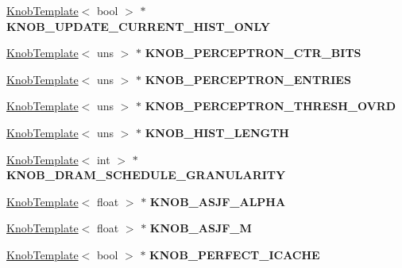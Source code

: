 \begin{DoxyCompactItemize}
\item 
\hypertarget{classall__knobs__c_a892cfb85ecfe285b22d06f8d9debe8f5}{
\hyperlink{classKnobTemplate}{KnobTemplate}$<$ bool $>$ $\ast$ {\bfseries KNOB\_\-UPDATE\_\-CURRENT\_\-HIST\_\-ONLY}}
\label{classall__knobs__c_a892cfb85ecfe285b22d06f8d9debe8f5}

\item 
\hypertarget{classall__knobs__c_a4e0c9cabfd5cf0704cd177f45fb22bc3}{
\hyperlink{classKnobTemplate}{KnobTemplate}$<$ uns $>$ $\ast$ {\bfseries KNOB\_\-PERCEPTRON\_\-CTR\_\-BITS}}
\label{classall__knobs__c_a4e0c9cabfd5cf0704cd177f45fb22bc3}

\item 
\hypertarget{classall__knobs__c_a1fc972188a6ca49600f55b396cf7f341}{
\hyperlink{classKnobTemplate}{KnobTemplate}$<$ uns $>$ $\ast$ {\bfseries KNOB\_\-PERCEPTRON\_\-ENTRIES}}
\label{classall__knobs__c_a1fc972188a6ca49600f55b396cf7f341}

\item 
\hypertarget{classall__knobs__c_a59005114c63ecf40c677c38a2db0c2e3}{
\hyperlink{classKnobTemplate}{KnobTemplate}$<$ uns $>$ $\ast$ {\bfseries KNOB\_\-PERCEPTRON\_\-THRESH\_\-OVRD}}
\label{classall__knobs__c_a59005114c63ecf40c677c38a2db0c2e3}

\item 
\hypertarget{classall__knobs__c_a28de6c797c5a2aadf18ddbf063769e09}{
\hyperlink{classKnobTemplate}{KnobTemplate}$<$ uns $>$ $\ast$ {\bfseries KNOB\_\-HIST\_\-LENGTH}}
\label{classall__knobs__c_a28de6c797c5a2aadf18ddbf063769e09}

\item 
\hypertarget{classall__knobs__c_a02025916c120090dedbfd08c6e9b68fe}{
\hyperlink{classKnobTemplate}{KnobTemplate}$<$ int $>$ $\ast$ {\bfseries KNOB\_\-DRAM\_\-SCHEDULE\_\-GRANULARITY}}
\label{classall__knobs__c_a02025916c120090dedbfd08c6e9b68fe}

\item 
\hypertarget{classall__knobs__c_a4b5116c2d753e3dcb70e5e061a9ea2e8}{
\hyperlink{classKnobTemplate}{KnobTemplate}$<$ float $>$ $\ast$ {\bfseries KNOB\_\-ASJF\_\-ALPHA}}
\label{classall__knobs__c_a4b5116c2d753e3dcb70e5e061a9ea2e8}

\item 
\hypertarget{classall__knobs__c_ad0d2c1b6646cb0c6f7fcd9dda391668b}{
\hyperlink{classKnobTemplate}{KnobTemplate}$<$ float $>$ $\ast$ {\bfseries KNOB\_\-ASJF\_\-M}}
\label{classall__knobs__c_ad0d2c1b6646cb0c6f7fcd9dda391668b}

\item 
\hypertarget{classall__knobs__c_a16ebda96a10b79dff969a0cc4a7b643e}{
\hyperlink{classKnobTemplate}{KnobTemplate}$<$ bool $>$ $\ast$ {\bfseries KNOB\_\-PERFECT\_\-ICACHE}}
\label{classall__knobs__c_a16ebda96a10b79dff969a0cc4a7b643e}


\end{DoxyCompactItemize}
